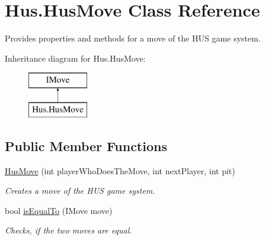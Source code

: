 \hypertarget{class_hus_1_1_hus_move}{}\section{Hus.\+Hus\+Move Class Reference}
\label{class_hus_1_1_hus_move}


Provides properties and methods for a move of the H\+US game system.  


Inheritance diagram for Hus.\+Hus\+Move\+:\begin{figure}[H]
\begin{center}
\leavevmode
\includegraphics[height=2.000000cm]{class_hus_1_1_hus_move}
\end{center}
\end{figure}
\subsection*{Public Member Functions}
\begin{DoxyCompactItemize}
\item 
\mbox{\hyperlink{class_hus_1_1_hus_move_ad4b8bf3e479f52ac7eb4013a2fd8aba3}{Hus\+Move}} (int player\+Who\+Does\+The\+Move, int next\+Player, int pit)
\begin{DoxyCompactList}\small\item\em Creates a move of the H\+US game system. \end{DoxyCompactList}\item 
bool \mbox{\hyperlink{class_hus_1_1_hus_move_abb8febf6f2c28b760d3c652f05322eb0}{is\+Equal\+To}} (I\+Move move)
\begin{DoxyCompactList}\small\item\em Checks, if the two moves are equal. \end{DoxyCompactList}\end{DoxyCompactItemize}
